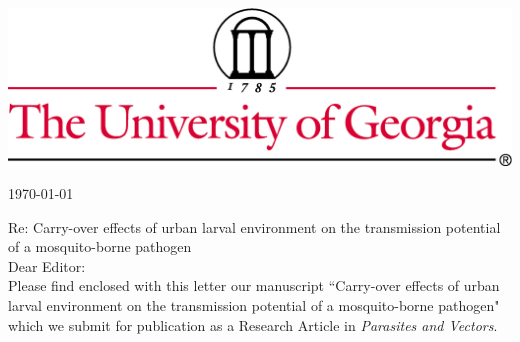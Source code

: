 \documentclass{letter}
\begin{document}

\begin{letter}


\vspace{-2in}
\includegraphics[width=\textwidth]{thin4c.png}

\begin{flushright}
\today
\end{flushright}


Re: Carry-over effects of urban larval environment on the transmission potential of a mosquito-borne pathogen\\

Dear Editor:\\

Please find enclosed with this letter our manuscript ``Carry-over effects of urban larval environment on the transmission potential of a mosquito-borne pathogen" which we submit for publication as a Research Article in \textit{Parasites and Vectors}.\\


\end{letter}
\end{document}
